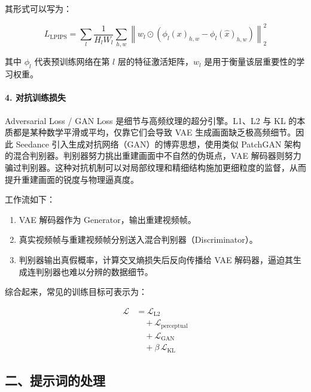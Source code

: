其形式可以写为：

\[
L_{\mathrm{LPIPS}} =
\sum_l
\frac{1}{H_l W_l}
\sum_{h,w}
\left\|
w_l\odot
\left(
\phi_l(x)_{h,w}-\phi_l(\hat{x})_{h,w}
\right)
\right\|_2^2
\]

其中 \(\phi_l\) 代表预训练网络在第 \(l\) 层的特征激活矩阵，\(w_l\) 是用于衡量该层重要性的学习权重。

\hypertarget{ux5bf9ux6297ux8badux7ec3ux635fux5931}{%
\paragraph{4. 对抗训练损失}\label{ux5bf9ux6297ux8badux7ec3ux635fux5931}}

Adversarial Loss / GAN Loss 是细节与高频纹理的超分引擎。L1、L2 与 KL 的本质都是某种数学平滑或平均，仅靠它们会导致 VAE 生成画面缺乏极高频细节。因此 Seedance 引入生成对抗网络（GAN）的博弈思想，使用类似 PatchGAN 架构的混合判别器。判别器努力挑出重建画面中不自然的伪斑点，VAE 解码器则努力骗过判别器。这种对抗机制可以对局部纹理和精细结构施加更细粒度的监督，从而提升重建画面的锐度与物理逼真度。

工作流如下：

\begin{enumerate}
\def\labelenumi{\arabic{enumi}.}
\tightlist
\item
  VAE 解码器作为 Generator，输出重建视频帧。
\item
  真实视频帧与重建视频帧分别送入混合判别器（Discriminator）。
\item
  判别器输出真假概率，计算交叉熵损失后反向传播给 VAE 解码器，逼迫其生成连判别器也难以分辨的数据细节。
\end{enumerate}

综合起来，常见的训练目标可表示为：

\[
\begin{aligned}
\mathcal{L}
&= \mathcal{L}_{\mathrm{L2}}
\\
&\quad + \mathcal{L}_{\mathrm{perceptual}}
\\
&\quad + \mathcal{L}_{\mathrm{GAN}}
\\
&\quad + \beta\,\mathcal{L}_{\mathrm{KL}}
\end{aligned}
\]

\hypertarget{ux4e8cux63d0ux793aux8bcdux7684ux5904ux7406}{%
\subsection{二、提示词的处理}\label{ux4e8cux63d0ux793aux8bcdux7684ux5904ux7406}}

